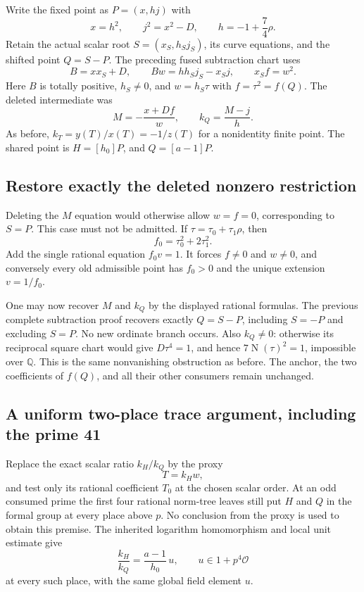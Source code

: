 Write the fixed point as $P=(x,hj)$ with
\[
 x=h^2,\qquad j^2=x^2-D,\qquad
 h=-1+\frac74\rho.
\]
Retain the actual scalar root $S=(x_S,h_Sj_S)$, its curve equations,
and the shifted point $Q=S-P$. The preceding fused subtraction chart
uses
\[
 B=xx_S+D,\qquad
 Bw=hh_Sj_S-x_Sj,\qquad x_Sf=w^2.
\]
Here $B$ is totally positive, $h_S\ne0$, and $w=h_S\tau$ with
$f=\tau^2=f(Q)$. The deleted intermediate was
\[
 M=-\frac{x+Df}{w},\qquad k_Q=\frac{M-j}{h}.
\]
As before, $k_T=y(T)/x(T)=-1/z(T)$ for a nonidentity finite point.
The shared point is $H=[h_0]P$, and $Q=[a-1]P$.

\subsection{Restore exactly the deleted nonzero restriction}

Deleting the $M$ equation would otherwise allow $w=f=0$, corresponding
to $S=P$. This case must not be admitted. If
$\tau=\tau_0+\tau_1\rho$, then
\[
 f_0=\tau_0^2+2\tau_1^2.
\]
Add the single rational equation $f_0v=1$. It forces $f\ne0$ and
$w\ne0$, and conversely every old admissible point has $f_0>0$ and
the unique extension $v=1/f_0$.

One may now recover $M$ and $k_Q$ by the displayed rational formulas.
The previous complete subtraction proof recovers exactly $Q=S-P$,
including $S=-P$ and excluding $S=P$. No new ordinate branch occurs.
Also $k_Q\ne0$: otherwise its reciprocal square chart would give
$D\tau^4=1$, and hence $7\operatorname N(\tau)^2=1$, impossible
over $\mathbb Q$. This is the same nonvanishing obstruction as before.
The anchor, the two coefficients of $f(Q)$, and all their other
consumers remain unchanged.

\subsection{A uniform two-place trace argument, including the prime 41}

Replace the exact scalar ratio $k_H/k_Q$ by the proxy
\[
 T=k_Hw,
\]
and test only its rational coefficient $T_0$ at the chosen scalar order.
At an odd consumed prime the first four rational norm-tree leaves still
put $H$ and $Q$ in the formal group at every place above $p$.
No conclusion from the proxy is used to obtain this premise.
The inherited logarithm homomorphism and local unit estimate give
\[
 \frac{k_H}{k_Q}=\frac{a-1}{h_0}\,u,
 \qquad u\in1+p^4\mathcal O
\]
at every such place, with the same global field element $u$.

